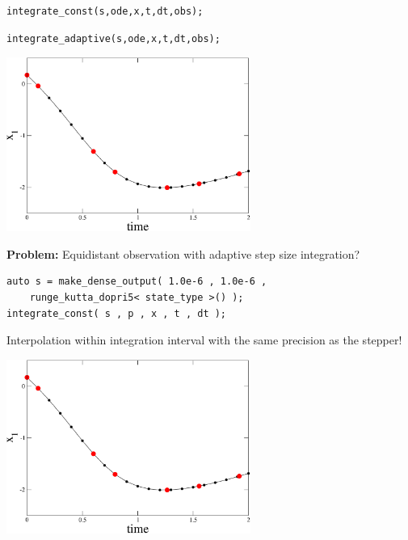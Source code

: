 \begin{frame}[fragile]


\vspace{2ex}

\begin{lstlisting}
integrate_const(s,ode,x,t,dt,obs);
\end{lstlisting}
\begin{lstlisting}
integrate_adaptive(s,ode,x,t,dt,obs);
\end{lstlisting}

\vspace{2ex}

\centerline{\includegraphics[draft=false,width=0.6\textwidth]{vdp_dense_output.pdf}}

\textbf{Problem:} Equidistant observation with adaptive step size integration?


\end{frame}



\begin{frame}[fragile]


\vspace{2ex}

\begin{lstlisting}
auto s = make_dense_output( 1.0e-6 , 1.0e-6 ,
    runge_kutta_dopri5< state_type >() );
integrate_const( s , p , x , t , dt );
\end{lstlisting}

Interpolation within integration interval with the same precision as the stepper!

\vspace{2ex}

\centerline{\includegraphics[draft=false,width=0.6\textwidth]{vdp_dense_output.pdf}}

\end{frame}







